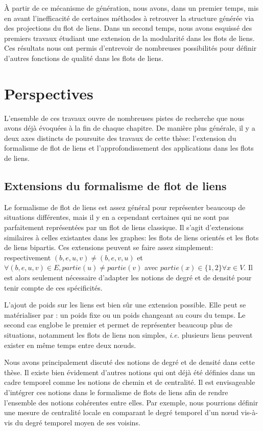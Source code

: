 \`A partir de ce mécanisme de génération, nous avons, dans un premier temps, mis en avant l'inefficacité de certaines méthodes à retrouver la structure générée via des projections du flot de liens.
Dans un second temps, nous avons esquissé des premiers travaux étudiant une extension de la modularité dans les flots de liens.
Ces résultats nous ont permis d'entrevoir de nombreuses possibilités pour définir d'autres fonctions de qualité dans les flots de liens.

\section{Perspectives}

L'ensemble de ces travaux ouvre de nombreuses pistes de recherche que nous avons déjà évoquées à la fin de chaque chapitre.
De manière plus générale, il y a deux axes distincts de poursuite des travaux de cette thèse: l'extension du formalisme de flot de liens et l'approfondissement des applications dans les flots de liens.

\subsection{Extensions du formalisme de flot de liens}

Le formalisme de flot de liens est assez général pour représenter beaucoup de situations différentes, mais il y en a cependant certaines qui ne sont pas parfaitement représentées par un flot de liens classique.
Il s'agit d'extensions similaires à celles existantes dans les graphes: les flots de liens orientés et les flots de liens bipartis.
Ces extensions peuvent se faire assez simplement: respectivement $(b,e,u,v)\neq (b,e,v,u)$ et $\forall (b,e,u,v) \in E, partie(u)\neq partie(v)$ avec $partie(x) \in \{1,2\} \forall x \in V$.
Il est alors seulement nécessaire d'adapter les notions de degré et de densité pour tenir compte de ces spécificités.

L'ajout de poids sur les liens est bien sûr une extension possible.
Elle peut se matérialiser par : un poids fixe ou un poids changeant au cours du temps.
Le second cas englobe le premier et permet de représenter beaucoup plus de situations, notamment les flots de liens non simples, \emph{i.e.} plusieurs liens peuvent exister en même temps entre deux n\oe{}uds.

Nous avons principalement discuté des notions de degré et de densité dans cette thèse.
Il existe bien évidement d'autres notions qui ont déjà été définies dans un cadre temporel comme les notions de chemin et de centralité.
Il est envisageable d'intégrer ces notions dans le formalisme de flots de liens afin de rendre l'ensemble des notions cohérentes entre elles.
Par exemple, nous pourrions définir une mesure de centralité locale en comparant le degré temporel d'un n\oe{}ud vis-à-vis du degré temporel moyen de ses voisins.

